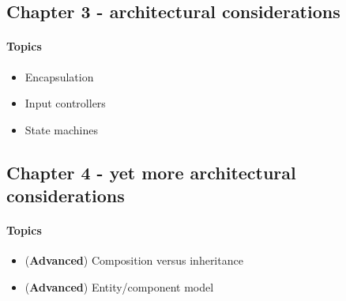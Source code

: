 

\subsection{Chapter 3 - architectural considerations}
\paragraph*{Topics}			
\begin{itemize}
	\item Encapsulation
	\item Input controllers
	\item State machines
\end{itemize}

\subsection{Chapter 4 - yet more architectural considerations}
\paragraph*{Topics}			
\begin{itemize}
	\item (\textbf{Advanced}) Composition versus inheritance
	\item (\textbf{Advanced}) Entity/component model
\end{itemize}
